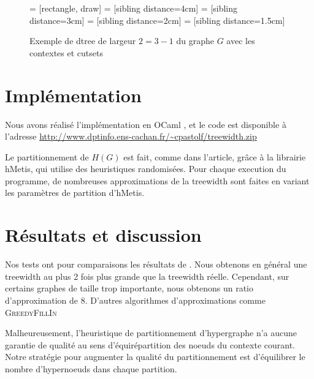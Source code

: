 \documentclass{article}
\begin{document}
\begin{figure}[H]
   = [rectangle, draw]
   = [sibling distance=4cm]
   = [sibling distance=3cm]
   = [sibling distance=2cm]
   = [sibling distance=1.5cm]
  \centering
 \caption{Exemple de dtree de largeur $2=3-1$ du graphe $G$ avec les contextes et cutsets}
\end{figure}

\newpage

\section{Implémentation}
Nous avons réalisé l'implémentation en OCaml \cite{ocaml}, et le code
est disponible à l'adresse
\url{http://www.dptinfo.ens-cachan.fr/~cpastolf/treewidth.zip}

Le partitionnement de $H(G)$ est fait, comme dans l'article, grâce à
la librairie hMetis, qui utilise des heuristiques randomisées.
Pour chaque execution du programme, de nombreuses approximations de la
treewidth sont faites en variant les paramètres de partition d'hMetis.


\section{Résultats et discussion}
Nos tests ont pour comparaisons les résultats de \cite{tree}.
Nous obtenons en général une treewidth au plus 2 fois plus grande que la
treewidth réelle.
Cependant, sur certains graphes de taille trop importante,
nous obtenons un ratio d'approximation de 8.
D'autres algorithmes d'approximations comme \textsc{GreedyFillIn}


Malheureusement, l'heuristique de partitionnement
d'hypergraphe n'a aucune garantie de qualité au sens
d'équirépartition des noeuds du contexte courant. 
Notre stratégie pour augmenter la qualité du partitionnement est
d'équilibrer le nombre d'hypernoeuds dans chaque partition.



\end{document}
